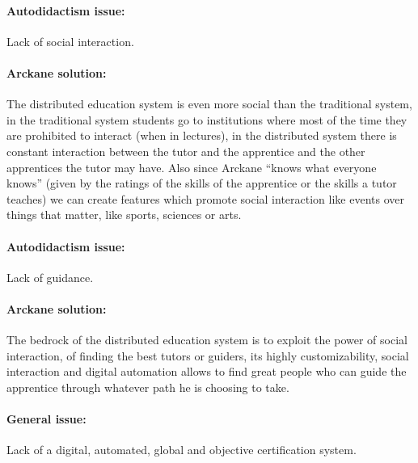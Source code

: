\paragraph{Autodidactism issue:} Lack of social interaction.
\paragraph{Arckane solution:} The distributed education system is even more social than the traditional system, in the traditional system students go to institutions where most of the time they are prohibited to interact (when in lectures), in the distributed system there is constant interaction between the tutor and the apprentice and the other apprentices the tutor may have. Also since Arckane “knows what everyone knows” (given by the ratings of the skills of the apprentice or the skills a tutor teaches) we can create features which promote social interaction like events over things that matter, like sports, sciences or arts. 

\paragraph{Autodidactism issue:} Lack of guidance.
\paragraph{Arckane solution:} The bedrock of the distributed education system is to exploit the power of social interaction, of finding the best tutors or guiders, its highly customizability, social interaction and digital automation allows to find great people who can guide the apprentice through whatever path he is choosing to take.

\paragraph{General issue:} Lack of a digital, automated, global and objective certification system.
